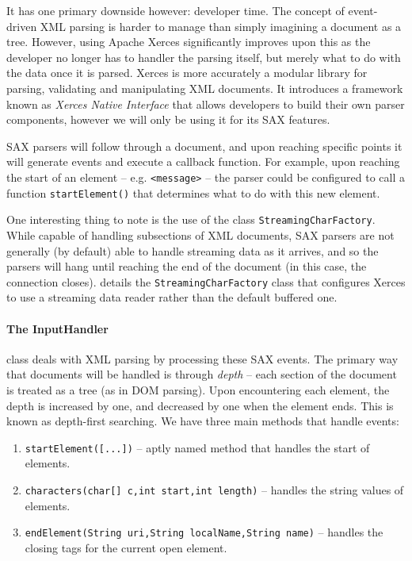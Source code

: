     It has one primary downside however: developer time. The concept of event-driven XML parsing is harder to manage than simply imagining a document as a tree. However, using Apache Xerces significantly improves upon this as the developer no longer has to handler the parsing itself, but merely what to do with the data once it is parsed. Xerces is more accurately a modular library for parsing, validating and manipulating XML documents. It introduces a framework known as \emph{Xerces Native Interface} that allows developers to build their own parser components, however we will only be using it for its SAX features.
    
    SAX parsers will follow through a document, and upon reaching specific points it will generate events and execute a callback function. For example, upon reaching the start of an element -- e.g. \verb!<message>! -- the parser could be configured to call a function \verb!startElement()! that determines what to do with this new element.
    
    One interesting thing to note is the use of the class \verb!StreamingCharFactory!. While capable of handling subsections of XML documents, SAX parsers are not generally (by default) able to handle streaming data as it arrives, and so the parsers will hang until reaching the end of the document (in this case, the connection closes). \cite{Shigeoka:2002ys} details the \verb!StreamingCharFactory! class that configures Xerces to use a streaming data reader rather than the default buffered one.
    
    \paragraph{The InputHandler} class deals with XML parsing by processing these SAX events. The primary way that documents will be handled is through \emph{depth} -- each section of the document is treated as a tree (as in DOM parsing). Upon encountering each element, the depth is increased by one, and decreased by one when the element ends. This is known as depth-first searching. We have three main methods that handle events:
    
    \begin{enumerate}
      \item \verb!startElement([...])! -- aptly named method that handles the start of elements.
      \item \verb!characters(char[] c,int start,int length)! -- handles the string values of elements.
      \item \verb!endElement(String uri,String localName,String name)! -- handles the closing tags for the current open element. 
    \end{enumerate}
    
